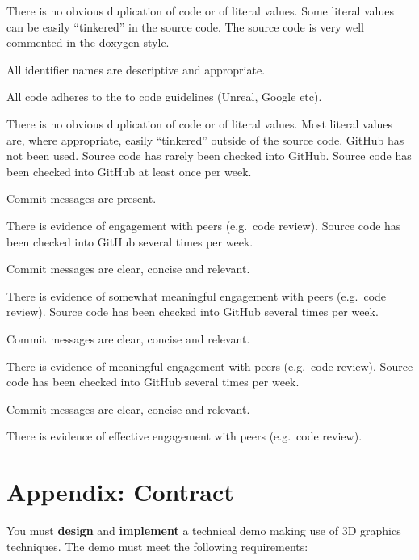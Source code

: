 \documentclass{../../fal_assignment}
\begin{document}
\begin{markingrubric}
\par There is no obvious duplication of code or of literal values. Some literal values can be easily ``tinkered'' in the source code. 
\grade The source code is very well commented in the doxygen style.
\par All identifier names are descriptive and appropriate.
\par All code adheres to the to code guidelines (Unreal, Google etc).
\par There is no obvious duplication of code or of literal values. Most literal values are, where appropriate, easily ``tinkered'' outside of the source code.  	
		\grade\fail GitHub has not been used.
		\grade Source code has rarely been checked into GitHub.
		\grade Source code  has been checked into GitHub at least once per week.
			\par Commit messages are present.
			\par There is evidence of engagement with peers (e.g.\ code review).
		\grade Source code  has been checked into GitHub several times per week.
			\par Commit messages are clear, concise and relevant.
			\par There is evidence of somewhat meaningful engagement with peers (e.g.\ code review).
		\grade Source code has been checked into GitHub several times per week.
			\par Commit messages are clear, concise and relevant.
			\par There is evidence of meaningful engagement with peers (e.g.\ code review).
		\grade Source code has been checked into GitHub several times per week.
			\par Commit messages are clear, concise and relevant.
			\par There is evidence of effective engagement with peers (e.g.\ code review).
\end{markingrubric}

\section*{Appendix: Contract}

You must \textbf{design} and \textbf{implement} a technical demo making use of 3D graphics techniques.
The demo must meet the following requirements:
\end{document}
